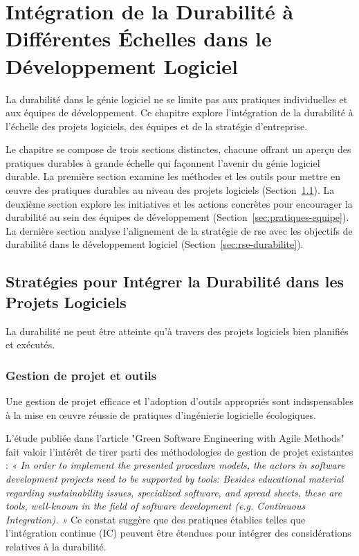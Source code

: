 
\chapter{Intégration de la Durabilité à Différentes Échelles dans le Développement Logiciel}	%
\label{pratique-globale}


La durabilité dans le génie logiciel ne se limite pas aux pratiques individuelles et aux équipes de développement. Ce chapitre explore l'intégration de la durabilité à l'échelle des projets logiciels, des équipes et de la stratégie d'entreprise.


Le chapitre se compose de trois sections distinctes, chacune offrant un aperçu des pratiques durables à grande échelle qui façonnent l'avenir du génie logiciel durable. La première section examine les méthodes et les outils pour mettre en œuvre des pratiques durables au niveau des projets logiciels (Section~\ref{sec:pratiques-projets}). La deuxième section explore les initiatives et les actions concrètes pour encourager la durabilité au sein des équipes de développement (Section~\ref{sec:pratiques-equipe}). La dernière section analyse l'alignement de la stratégie de \acrshort{rse} avec les objectifs de durabilité dans le développement logiciel (Section~\ref{sec:rse-durabilite}).


\section{Stratégies pour Intégrer la Durabilité dans les Projets Logiciels}
\label{sec:pratiques-projets}

La durabilité ne peut être atteinte qu'à travers des projets logiciels bien planifiés et exécutés.

\subsection{Gestion de projet et outils}
Une gestion de projet efficace et l'adoption d'outils appropriés sont indispensables à la mise en œuvre réussie de pratiques d'ingénierie logicielle écologiques. 


L'étude publiée dans l'article "Green Software Engineering with Agile Methods"~\cite{GreenAgileMethods} fait valoir l'intérêt de tirer parti des méthodologies de gestion de projet existantes : \emph{« In order to implement the presented procedure models, the actors in software development projects need to be supported by tools: Besides educational material regarding sustainability issues, specialized software, and spread sheets, these are tools, well-known in the field of software development (e.g. Continuous Integration). »} Ce constat suggère que des pratiques établies telles que l'intégration continue (IC) peuvent être étendues pour intégrer des considérations relatives à la durabilité.


